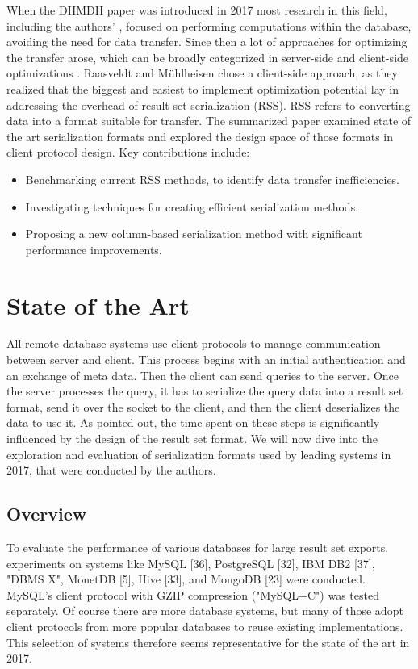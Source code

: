 \documentclass[sigconf]{acmart}
\begin{document}
When the DHMDH paper was introduced in 2017 most research in this field, including the authors' \cite{raasveldt2016vectorized}, focused on performing computations within the database, avoiding the need for data transfer. Since then a lot of approaches for optimizing the transfer arose, which can be broadly categorized in server-side and client-side optimizations \cite{neueres paper}. Raasveldt and Mühlheisen chose a client-side approach, as they realized that the biggest and easiest to implement optimization potential lay in addressing the overhead of result set serialization (RSS). RSS refers to converting data into a format suitable for transfer.
The summarized paper examined state of the art serialization formats and explored the design space of those formats in client protocol design.
Key contributions include:
\begin{itemize}
  \item Benchmarking current RSS methods, to identify data transfer inefficiencies.
  \item Investigating techniques for creating efficient serialization methods.
  \item Proposing a new column-based serialization method with significant performance improvements.
\end{itemize}

\section{State of the Art}
All remote database systems use client protocols to manage communication between server and client. This process begins with an initial authentication and an exchange of meta data. Then the client can send queries to the server. Once the server processes the query, it has to serialize the query data into a result set format, send it over the socket to the client, and then the client deserializes the data to use it.
As pointed out, the time spent on these steps is significantly influenced by the design of the result set format. We will now dive into the exploration and evaluation of serialization formats used by leading systems in 2017, that were conducted by the authors.

\subsection{Overview}
To evaluate the performance of various databases for large result set exports, experiments on systems like MySQL [36], PostgreSQL [32], IBM DB2 [37], "DBMS X", MonetDB [5], Hive [33], and MongoDB [23] were conducted. MySQL's client protocol with GZIP compression ("MySQL+C") was tested separately. Of course there are more database systems, but many of those adopt client protocols from more popular databases to reuse existing implementations. This selection of systems therefore seems representative for the state of the art in 2017.
\end{document}
